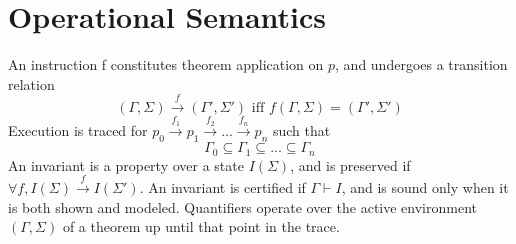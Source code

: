 \documentclass{article}
\begin{document}
	\section{Operational Semantics}
	An instruction f constitutes theorem application on $p$, and undergoes a transition relation
	$$(\Gamma,\Sigma)\xrightarrow{f}(\Gamma',\Sigma') \text{ iff } f(\Gamma,\Sigma) = (\Gamma',\Sigma')$$
	Execution is traced for $p_0\xrightarrow{f_1}p_1\xrightarrow{f_2}\text{...}\xrightarrow{f_n}p_{n}$ such that
	$$\Gamma_0\subseteq\Gamma_1\subseteq\text{...}\subseteq\Gamma_{n}$$
	An invariant is a property over a state $I(\Sigma)$, and is preserved if $\forall f, I(\Sigma) \xrightarrow{f} I(\Sigma')$. An invariant is certified if $\Gamma \vdash I$, and is sound only when it is both shown and modeled. Quantifiers operate over the active environment $(\Gamma, \Sigma)$ of a theorem up until that point in the trace.
\end{document}
